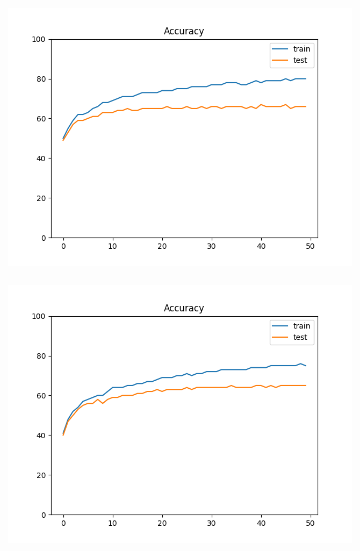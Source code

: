 \documentclass[12pt]{article}
\begin{document}
\begin{figure}
\begin{subfigure}{0.24\textwidth}
    \includegraphics[width=\linewidth]{accuracies_2_3_bs4.png}
  \end{subfigure}
  \begin{subfigure}{0.24\textwidth}
    \centering
    \includegraphics[width=\linewidth]{accuracies_5_mse.png}
  \end{subfigure}


\end{figure}
\end{document}
